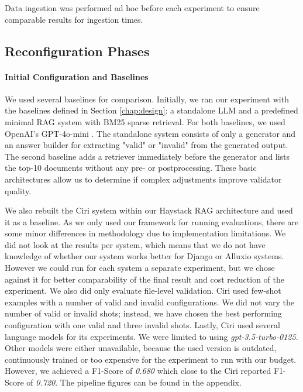 Data ingestion was performed ad hoc before each experiment to ensure comparable results for ingestion times.

\subsection{Reconfiguration Phases} \label{sec:exp_results} 

\paragraph{Initial Configuration and Baselines} \label{sec:exp_initial_config}
We used several baselines for comparison. Initially, we ran our experiment with the baselines defined in Section \ref{chap:design}: a standalone LLM and a predefined minimal RAG system with BM25 sparse retrieval. For both baselines, we used OpenAI's GPT-4o-mini \cite{OpenAI_2022}. The standalone system consists of only a generator and an answer builder for extracting "valid" or "invalid" from the generated output. The second baseline adds a retriever immediately before the generator and lists the top-10 documents without any pre- or postprocessing. These basic architectures allow us to determine if complex adjustments improve validator quality.

We also rebuilt the Ciri system within our Haystack RAG architecture and used it as a baseline. As we only used our framework for running evaluations, there are some minor differences in methodology due to implementation limitations. We did not look at the results per system, which means that we do not have knowledge of whether our system works better for Django or Alluxio systems. However we could run for each system a separate experiment, but we chose against it for better comparability of the final result and cost reduction of the experiment. We also did only evaluate file-level validation. Ciri used few-shot examples with a number of valid and invalid configurations. We did not vary the number of valid or invalid shots; instead, we have chosen the best performing configuration with one valid and three invalid shots. Lastly, Ciri used several language models for its experiments. We were limited to using \textit{gpt-3.5-turbo-0125}\cite{OpenAI_2022}. Other models were either unavailable, because the used version is outdated, continuously trained or too expensive for the experiment to run with our budget. However, we achieved a F1-Score of \textit{0.680} which close to the Ciri reported F1-Score of \textit{0.720}. The pipeline figures can be found in the appendix.


